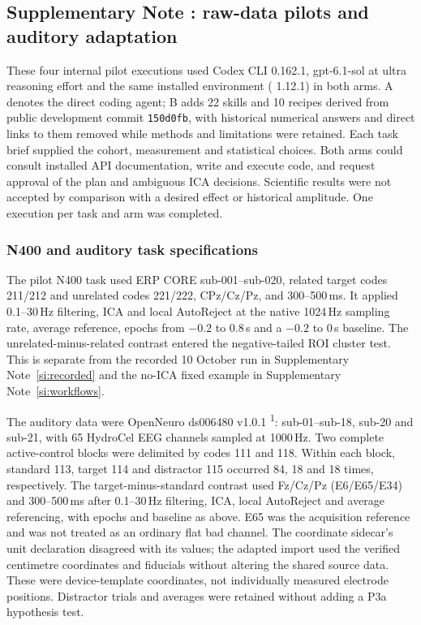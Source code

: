 \subsection*{Supplementary Note \thesuppnote: raw-data pilots and auditory adaptation}
\label{si:pilots}

These four internal pilot executions used Codex CLI 0.162.1, gpt-6.1-sol at ultra reasoning effort and the same installed environment (\mne{} 1.12.1) in both arms. A denotes the direct coding agent; B adds 22 skills and 10 recipes derived from public development commit \texttt{150d0fb}, with historical numerical answers and direct links to them removed while methods and limitations were retained. Each task brief supplied the cohort, measurement and statistical choices. Both arms could consult installed API documentation, write and execute code, and request approval of the plan and ambiguous ICA decisions. Scientific results were not accepted by comparison with a desired effect or historical amplitude. One execution per task and arm was completed.

\subsubsection*{N400 and auditory task specifications}

The pilot N400 task used ERP CORE sub-001--sub-020, related target codes 211/212 and unrelated codes 221/222, CPz/Cz/Pz, and 300--500\,ms. It applied 0.1--30\,Hz filtering, ICA and local AutoReject at the native 1024\,Hz sampling rate, average reference, epochs from $-0.2$ to $0.8$\,s and a $-0.2$ to 0\,s baseline. The unrelated-minus-related contrast entered the negative-tailed ROI cluster test. This is separate from the recorded 10 October run in Supplementary Note~\ref*{si:recorded} and the no-ICA fixed example in Supplementary Note~\ref*{si:workflows}.

The auditory data were OpenNeuro ds006480 v1.0.1 \textsuperscript{1}: sub-01--sub-18, sub-20 and sub-21, with 65 HydroCel EEG channels sampled at 1000\,Hz. Two complete active-control blocks were delimited by codes 111 and 118. Within each block, standard 113, target 114 and distractor 115 occurred 84, 18 and 18 times, respectively. The target-minus-standard contrast used Fz/Cz/Pz (E6/E65/E34) and 300--500\,ms after 0.1--30\,Hz filtering, ICA, local AutoReject and average referencing, with epochs and baseline as above. E65 was the acquisition reference and was not treated as an ordinary flat bad channel. The coordinate sidecar's unit declaration disagreed with its values; the adapted import used the verified centimetre coordinates and fiducials without altering the shared source data. These were device-template coordinates, not individually measured electrode positions. Distractor trials and averages were retained without adding a P3a hypothesis test.

